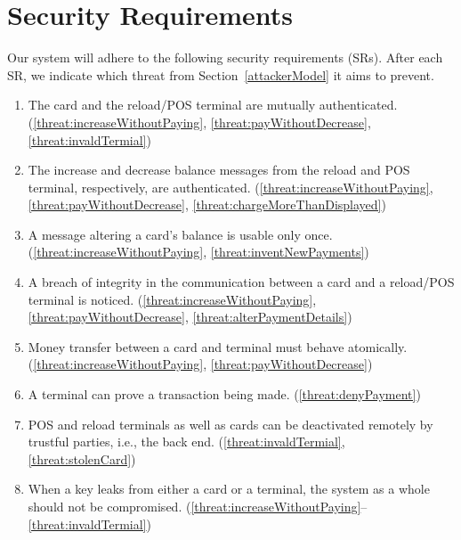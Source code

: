 \documentclass{article}
\begin{document}
\section{Security Requirements}
Our system will adhere to the following security requirements (SRs). After each SR, we indicate which threat from Section~\ref{attackerModel} it aims to prevent.
\begin{enumerate}[label={SR\arabic*:}, ref={SR\arabic*}, leftmargin=3\parindent]
    \item \label{sr:mutualAuth}
    The card and the reload/POS terminal are mutually authenticated. (\ref{threat:increaseWithoutPaying}, \ref{threat:payWithoutDecrease}, \ref{threat:invaldTermial})
    
    \item \label{sr:messageAuth}
    The increase and decrease balance messages from the reload and POS terminal, respectively, are authenticated. (\ref{threat:increaseWithoutPaying}, \ref{threat:payWithoutDecrease}, \ref{threat:chargeMoreThanDisplayed})
    
    \item \label{sr:replayProtection}
    A message altering a card's balance is usable only once. (\ref{threat:increaseWithoutPaying}, \ref{threat:inventNewPayments})
    
    \item \label{sr:messageIntegrity}
    A breach of integrity in the communication between a card and a reload/POS terminal is noticed. (\ref{threat:increaseWithoutPaying}, \ref{threat:payWithoutDecrease}, \ref{threat:alterPaymentDetails})
    
    \item \label{sr:atomic}
    Money transfer between a card and terminal must behave atomically. (\ref{threat:increaseWithoutPaying}, \ref{threat:payWithoutDecrease})

    \item \label{sr:nonRepudiation}
    A terminal can prove a transaction being made. (\ref{threat:denyPayment})

    \item \label{sr:block}
    POS and reload terminals as well as cards can be deactivated remotely by trustful parties, i.e., the back end. (\ref{threat:invaldTermial}, \ref{threat:stolenCard})

    \item \label{sr:keyLeakage}
    When a key leaks from either a card or a terminal, the system as a whole should not be compromised. (\ref{threat:increaseWithoutPaying}--\ref{threat:invaldTermial})
\end{enumerate}
\end{document}
